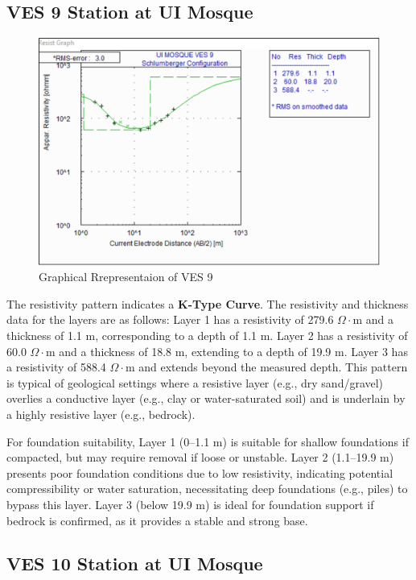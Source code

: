\documentclass[12pt,a4paper]{report}
\begin{document}
\subsection{VES 9 Station at UI Mosque}

\begin{figure}[H]
    \centering
    \includegraphics[width=1.0\textwidth]{ui_ves9.png}
    \caption{Graphical Rrepresentaion of VES 9}
    \label{fig:VES_9_Curve}
\end{figure}

The resistivity pattern indicates a \textbf{K-Type Curve}. The resistivity and thickness data for the layers are as follows: Layer 1 has a resistivity of 279.6 $\Omega\cdot$m and a thickness of 1.1 m, corresponding to a depth of 1.1 m. Layer 2 has a resistivity of 60.0 $\Omega\cdot$m and a thickness of 18.8 m, extending to a depth of 19.9 m. Layer 3 has a resistivity of 588.4 $\Omega\cdot$m and extends beyond the measured depth. This pattern is typical of geological settings where a resistive layer (e.g., dry sand/gravel) overlies a conductive layer (e.g., clay or water-saturated soil) and is underlain by a highly resistive layer (e.g., bedrock).

For foundation suitability, Layer 1 (0--1.1 m) is suitable for shallow foundations if compacted, but may require removal if loose or unstable. Layer 2 (1.1--19.9 m) presents poor foundation conditions due to low resistivity, indicating potential compressibility or water saturation, necessitating deep foundations (e.g., piles) to bypass this layer. Layer 3 (below 19.9 m) is ideal for foundation support if bedrock is confirmed, as it provides a stable and strong base.
\subsection{VES 10 Station at UI Mosque}
\end{document}
